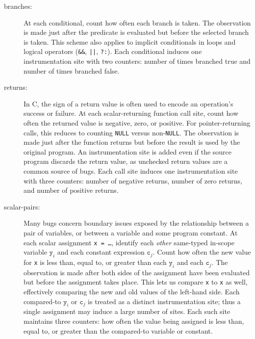 \documentclass[draft]{sig-alternate}
\begin{document}
\begin{description}
\sloppy
\item[branches:] At each conditional,
  count how often each branch is taken.  The observation is
  made just after the predicate is evaluated but before the selected
  branch is taken.  This scheme also applies to implicit conditionals
  in loops and logical operators (\texttt{\&\&}, \texttt{||},
  \texttt{?:}).  Each conditional induces one instrumentation site
  with two counters: number of times branched true and number of times
  branched false.

\item[returns:] In C, the
  sign of a return value is often used to encode an operation's success or failure.
  At each scalar-returning function call site, count how
  often the returned value is negative, zero, or positive.  For
  pointer-returning calls, this reduces to counting
  \texttt{NULL} versus non-\texttt{NULL}.  The observation is made
  just after the function returns but before the result is used by the
  original program.  An instrumentation site is added even if the
  source program discards the return value, as unchecked return
  values are a common source of bugs.  Each call site induces one
  instrumentation site with three counters: number of negative
  returns, number of zero returns, and number of positive returns.

\item[scalar-pairs:] Many bugs
  concern boundary issues exposed by the relationship between a pair
  of variables, or between a variable and some program constant.  At
  each scalar assignment \texttt{x = \dots}, identify each
  \emph{other} same-typed in-scope variable $\mathtt{y}_i$ and each
  constant expression $\mathtt{c}_j$.  Count how often the new value
  for \texttt{x} is less than, equal to, or greater than each
  $\mathtt{y}_i$ and each $\mathtt{c}_j$.  The observation is made
  after both sides of the assignment have been evaluated but
  before the assignment takes place.  This lets us compare
  \texttt{x} to \texttt{x} as well, effectively comparing the new and
  old values of the left-hand side.  Each compared-to $\mathtt{y}_i$
  or $\mathtt{c}_j$ is treated as a distinct instrumentation site;
  thus a single assignment may induce a large number of sites.  Each
  such site maintains three counters: how often the value being
  assigned is less than, equal to, or greater than the compared-to
  variable or constant.
\end{description}
\end{document}
